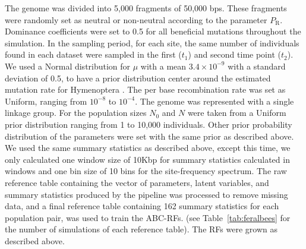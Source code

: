 \documentclass[a4paper, 12pt]{article}
\begin{document}
The genome was divided into 5,000 fragments of 50,000 bps. These fragments were randomly set as neutral or non-neutral according to the parameter $P_{\mathrm{R}}$. Dominance coefficients were set to 0.5 for all beneficial mutations throughout the simulation. In the sampling period, for each site, the same number of individuals found in each dataset were sampled in the first ($t_1$) and second time point ($t_2$). We used a Normal distribution for $\mu$ with a mean $3.4\times 10^{-9}$ with a standard deviation of 0.5, to have a prior distribution center around the estimated mutation rate for Hymenoptera \citep{Liu:2017ea}. The per base recombination rate was set as Uniform, ranging from $10^{-8}$ to $10^{-4}$. The genome was represented with a single linkage group. For the population sizes $N_{\mathrm{0}}$ and $N$ were taken from a Uniform prior distribution ranging from 1 to 10,000 individuals. Other prior probability distribution of the parameters were set with the same prior as described above. We used the same summary statistics as described above, except this time, we only calculated one window size of 10Kbp for summary statistics calculated in windows and one bin size of 10 bins for the site-frequency spectrum. The raw reference table containing the vector of parameters, latent variables, and summary statistics produced by the pipeline was processed to remove missing data, and a final reference table containing 162 summary statistics for each population pair, was used to train the ABC-RFs. 
(see Table~\ref{tab:feralbees} for the number of simulations of each reference table). The RFs were grown as described above. 
\end{document}
